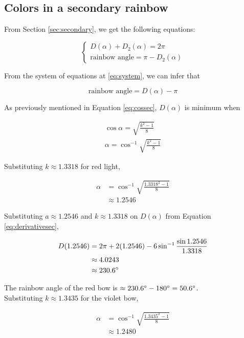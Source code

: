 \documentclass[a4paper,12pt]{article}
\begin{document}
\subsection{Colors in a secondary rainbow}

From Section \ref{sec:secondary}, we get the following equations:

\begin{equation}
\begin{cases}
D(\alpha) + D_2(\alpha) = 2\pi\\
\text{rainbow angle} = \pi - D_2(\alpha) 
\end{cases}
\label{eq:system}
\end{equation}

From the system of equations at \eqref{eq:system}, we can infer that

\begin{equation}
\text{rainbow angle} = D(\alpha) - \pi
\end{equation}

As previously mentioned in Equation \eqref{eq:cossec}, $D(\alpha)$ is minimum when

\begin{align}
\cos \alpha = \sqrt{\frac{k^2-1}{8}} \nonumber\\
\alpha = \cos^{-1} \sqrt{\frac{k^2-1}{8}}
\end{align}

Substituting $k \approx 1.3318$ for red light,

\begin{align*}
\alpha &= \cos^{-1} \sqrt{\frac{1.3318^2-1}{8}}\\
&\approx 1.2546
\end{align*}

Substituting $a \approx 1.2546$ and $k \approx 1.3318$ on $D(\alpha)$ from Equation \ref{eq:derivativesec},

\begin{align*}
D(1.2546) &= 2\pi + 2(1.2546) - 6 \sin^{-1}{\frac{\sin 1.2546}{1.3318}}\\
&\approx 4.0243\\
&\approx 230.6 \degree
\end{align*}

The rainbow angle of the red bow is $\approx 230.6\degree - 180\degree = 50.6\degree$.\\

Substituting $k \approx 1.3435$ for the violet bow,

\begin{align*}
\alpha &= \cos^{-1} \sqrt{\frac{1.3435^2-1}{8}}\\
&\approx 1.2480
\end{align*}
\end{document}
